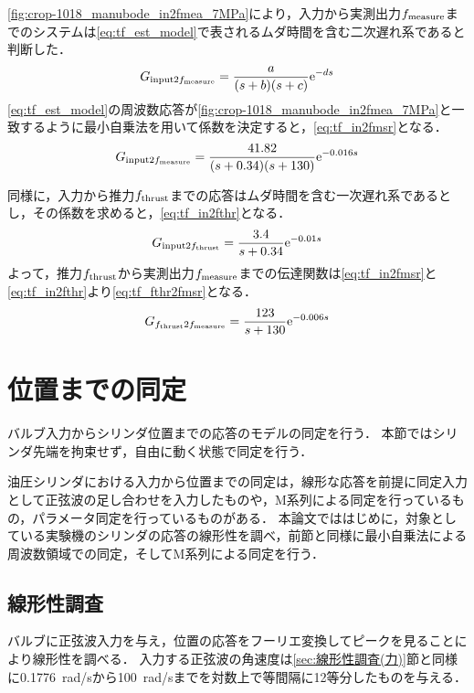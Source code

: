 \figname\ref{fig:crop-1018_manubode_in2fmea_7MPa}により，入力から実測出力$f_\mathrm{measure}$までのシステムは\eqnname\eqref{eq:tf_est_model}で表されるムダ時間を含む二次遅れ系であると判断した．
\begin{align}
    \label{eq:tf_est_model}
    G_{\mathrm{input}2f_\mathrm{measure}} = \frac{a}{(s+b)(s+c)}\mathrm{e}^{-ds}
\end{align}
\eqnname\eqref{eq:tf_est_model}の周波数応答が\figname\ref{fig:crop-1018_manubode_in2fmea_7MPa}と一致するように最小自乗法を用いて係数を決定すると，\eqnname\eqref{eq:tf_in2fmsr}となる．
\begin{align}
    \label{eq:tf_in2fmsr}
    G_{\mathrm{input}2f_\mathrm{measure}} = \frac{41.82}{(s+0.34)(s+130)}\mathrm{e}^{-0.016s}
\end{align}

同様に，入力から推力$f_\mathrm{thrust}$までの応答はムダ時間を含む一次遅れ系であるとし，その係数を求めると，\eqnname\eqref{eq:tf_in2fthr}となる．
\begin{align}
    \label{eq:tf_in2fthr}
    G_{\mathrm{input}2f_\mathrm{thrust}} = \frac{3.4}{s+0.34}\mathrm{e}^{-0.01s}
\end{align}
よって，推力$f_\mathrm{thrust}$から実測出力$f_\mathrm{measure}$までの伝達関数は\eqnname\eqref{eq:tf_in2fmsr}と\eqnname\eqref{eq:tf_in2fthr}より\eqnname\eqref{eq:tf_fthr2fmsr}となる．
\begin{align}
    \label{eq:tf_fthr2fmsr}
    G_{f_\mathrm{thrust}2f_\mathrm{measure}} = \frac{123}{s+130}\mathrm{e}^{-0.006s}
\end{align}
\section{位置までの同定}
\label{sec:位置までの同定}
バルブ入力からシリンダ位置までの応答のモデルの同定を行う．
本節ではシリンダ先端を拘束せず，自由に動く状態で同定を行う．

油圧シリンダにおける入力から位置までの同定は，線形な応答を前提に同定入力として正弦波の足し合わせを入力したもの\cite{ling2012system,zheng2009application}や，M系列による同定を行っているもの\cite{松本貴夢20166,松本貴夢2016}，パラメータ同定を行っているもの\cite{前島祐三2011}がある．
本論文でははじめに，対象としている実験機のシリンダの応答の線形性を調べ，前節と同様に最小自乗法による周波数領域での同定，そしてM系列による同定を行う．
\subsection{線形性調査}
バルブに正弦波入力を与え，位置の応答をフーリエ変換してピークを見ることにより線形性を調べる．
入力する正弦波の角速度は\ref{sec:線形性調査(力)}節と同様に\SI{0.1776}{rad/s}から\SI{100}{rad/s}までを対数上で等間隔に12等分したものを与える．

